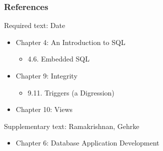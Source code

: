 \documentclass[dvipsnames]{beamer}
\theoremstyle{plain}
\begin{document}
\begin{frame}
  \frametitle{References}

  \begin{block}{Required text: Date}
    \begin{itemize}
      \item Chapter 4: An Introduction to SQL
      \begin{itemize}
        \item 4.6. Embedded SQL
      \end{itemize}

      \item Chapter 9: Integrity
      \begin{itemize}
        \item 9.11. \alert{Triggers (a Digression)}
      \end{itemize}

      \item Chapter 10: \alert{Views}
    \end{itemize}
  \end{block}

  \begin{block}{Supplementary text: Ramakrishnan, Gehrke}
    \begin{itemize}
      \item Chapter 6: Database Application Development
    \end{itemize}
  \end{block}
\end{frame}
\end{document}
